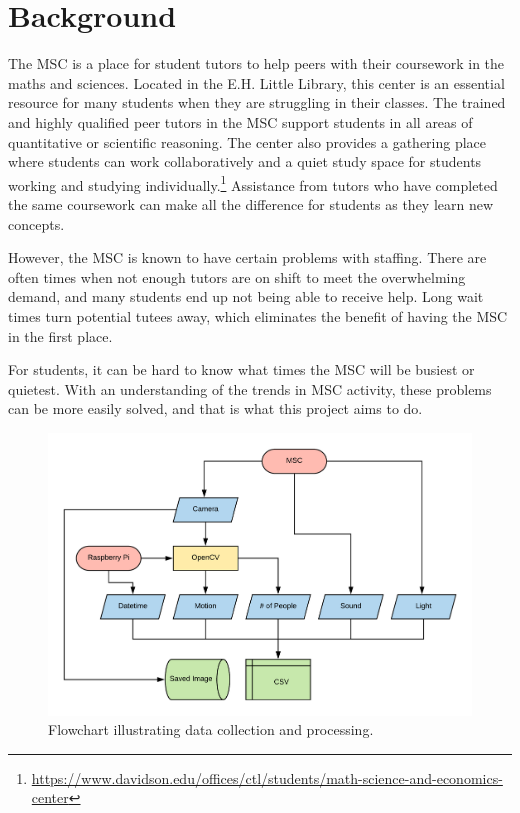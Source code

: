 
\section{Background}
\label{sec:background}

The MSC is a place for student tutors to help peers with their coursework in the maths and sciences. Located in the E.H. Little Library, this center is an essential resource for many students when they are struggling in their classes. The trained and highly qualified peer tutors in the MSC support students in all areas of quantitative or scientific reasoning. The center also provides a gathering place where students can work collaboratively and a quiet study space for students working and studying individually.\footnote{\url{https://www.davidson.edu/offices/ctl/students/math-science-and-economics-center}} Assistance from tutors who have completed the same coursework can make all the difference for students as they learn new concepts.

However, the MSC is known to have certain problems with staffing. There are often times when not enough tutors are on shift to meet the overwhelming demand, and many students end up not being able to receive help. Long wait times turn potential tutees away, which eliminates the benefit of having the MSC in the first place.

For students, it can be hard to know what times the MSC will be busiest or quietest. With an understanding of the trends in MSC activity, these problems can be more easily solved, and that is what this project aims to do.

\begin{figure}[t]
    \centering
    \includegraphics[width=0.97\linewidth]{figs/flowchart.png}
    \caption{Flowchart illustrating data collection and processing.}
    \label{fig:flowchart}
\end{figure}